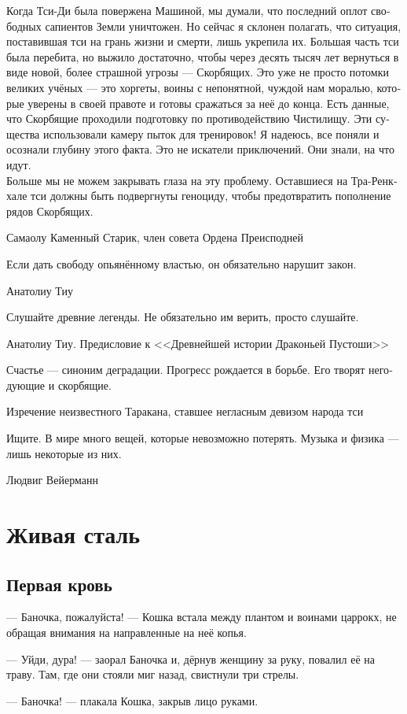 \documentclass[a4paper,12pt,fleqn]{book}\usepackage{polyglossia}\setdefaultlanguage[babelshorthands=true]{russian}\setotherlanguage{english}\defaultfontfeatures{Ligatures=TeX,Mapping=tex-text}\usepackage{xcolor}\newcommand{\ml}[3]{#2}
\begin{document}
{\epigraph
{Когда Тси-Ди была повержена Машиной, мы думали, что последний оплот свободных сапиентов Земли уничтожен.
Но сейчас я склонен полагать, что ситуация, поставившая тси на грань жизни и смерти, лишь укрепила их.
Большая часть тси была перебита, но выжило достаточно, чтобы через десять тысяч лет вернуться в виде новой, более страшной угрозы --- Скорбящих.
Это уже не просто потомки великих учёных --- это хоргеты, воины с непонятной, чуждой нам моралью, которые уверены в своей правоте и готовы сражаться за неё до конца.
Есть данные, что Скорбящие проходили подготовку по противодействию Чистилищу.
Эти существа использовали камеру пыток для тренировок!
Я надеюсь, все поняли и осознали глубину этого факта.
Это не искатели приключений.
Они знали, на что идут.\\
Больше мы не можем закрывать глаза на эту проблему.
Оставшиеся на Тра-Ренкхале тси должны быть подвергнуты геноциду, чтобы предотвратить пополнение рядов Скорбящих.}
{Самаолу Каменный Старик, член совета Ордена Преисподней}

\epigraph
{Если дать свободу опьянённому властью, он обязательно нарушит закон.}
{Анатолиу Тиу}

\epigraph
{Слушайте древние легенды.
Не обязательно им верить, просто слушайте.}
{Анатолиу Тиу.
Предисловие к <<Древнейшей истории Драконьей Пустоши>>}

\epigraph{Счастье --- синоним деградации.
Прогресс рождается в борьбе.
Его творят негодующие и скорбящие.}
{Изречение неизвестного Таракана, ставшее негласным девизом народа тси}

\epigraph{Ищите.
В мире много вещей, которые невозможно потерять.
Музыка и физика --- лишь некоторые из них.}
{Людвиг Вейерманн}

\chapter{Живая сталь}

\section{Первая кровь}

--- Баночка, пожалуйста! --- Кошка встала между плантом и воинами царрокх, не обращая внимания на направленные на неё копья.

--- Уйди, дура! --- заорал Баночка и, дёрнув женщину за руку, повалил её на траву.
Там, где они стояли миг назад, свистнули три стрелы.

--- Баночка! --- плакала Кошка, закрыв лицо руками.

}
\end{document}
